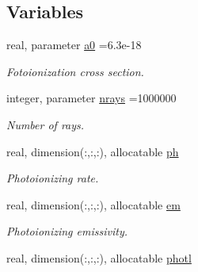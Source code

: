 \subsection*{Variables}
\begin{DoxyCompactItemize}
\item 
\hypertarget{namespacedifrad_a0062472e34b740c2c1cb5084d3284056}{}real, parameter \hyperlink{namespacedifrad_a0062472e34b740c2c1cb5084d3284056}{a0} =6.\+3e-\/18\label{namespacedifrad_a0062472e34b740c2c1cb5084d3284056}

\begin{DoxyCompactList}\small\item\em Fotoionization cross section. \end{DoxyCompactList}\item 
\hypertarget{namespacedifrad_aac6943b42d4dede95a3296bdc29c629a}{}integer, parameter \hyperlink{namespacedifrad_aac6943b42d4dede95a3296bdc29c629a}{nrays} =1000000\label{namespacedifrad_aac6943b42d4dede95a3296bdc29c629a}

\begin{DoxyCompactList}\small\item\em Number of rays. \end{DoxyCompactList}\item 
\hypertarget{namespacedifrad_ab532f1879434284f63aa97c79c305236}{}real, dimension(\+:,\+:,\+:), allocatable \hyperlink{namespacedifrad_ab532f1879434284f63aa97c79c305236}{ph}\label{namespacedifrad_ab532f1879434284f63aa97c79c305236}

\begin{DoxyCompactList}\small\item\em Photoionizing rate. \end{DoxyCompactList}\item 
\hypertarget{namespacedifrad_a7d908916fd1e050b9c5ba48771186d5b}{}real, dimension(\+:,\+:,\+:), allocatable \hyperlink{namespacedifrad_a7d908916fd1e050b9c5ba48771186d5b}{em}\label{namespacedifrad_a7d908916fd1e050b9c5ba48771186d5b}

\begin{DoxyCompactList}\small\item\em Photoionizing emissivity. \end{DoxyCompactList}\item 
\hypertarget{namespacedifrad_a3d6a043ec876c626f11238b6260a036a}{}real, dimension(\+:,\+:,\+:), allocatable \hyperlink{namespacedifrad_a3d6a043ec876c626f11238b6260a036a}{photl}\label{namespacedifrad_a3d6a043ec876c626f11238b6260a036a}


\end{DoxyCompactItemize}
